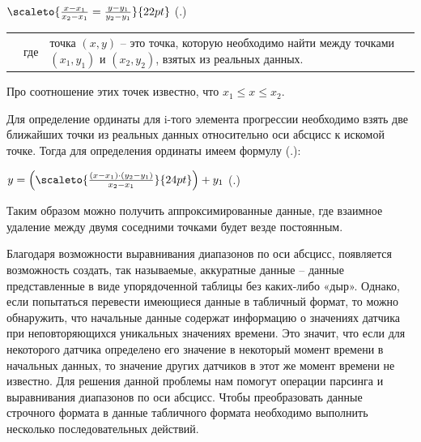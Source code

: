 {  \formulaspace \par \redline
    $\scaleto{\frac{x - x_1}{x_2 - x_1} = \frac{y - y_1}{y_2 - y_1}}{22pt}$
    \hfill (\thechaptercntr .\theformulacntr) \redline
  \formulaspace \addtocounter{formulacntr}{1}

  \begin{tabular}{p{}p{}p{}}
		& где  & точка $\left(x, y\right)$ {--} это точка, которую необходимо найти между точками $\left(x_1, y_1\right)$ и $\left(x_2, y_2\right)$, взятых из реальных данных. \\
  \end{tabular}

  \par \redline Про соотношение этих точек известно, что $x_1 \leq x \leq x_2$. 

  \par \redline Для определение ординаты для i-того элемента прогрессии необходимо взять две ближайших точки из реальных данных относительно оси абсцисс к искомой точке. Тогда для определения ординаты имеем формулу (\thechaptercntr .\theformulacntr):

  \formulaspace \par \redline
    $y = \left(\scaleto{\frac{\left(x - x_1\right) \cdot \left(y_2 - y_1\right)}{x_2 - x_1}}{24pt}\right) + y_1$
    \hfill (\thechaptercntr .\theformulacntr) \redline
  \formulaspace \addtocounter{formulacntr}{1}

  \par \redline Таким образом можно получить аппроксимированные данные, где взаимное удаление между двумя соседними точками будет везде постоянным.  

  \par \redline Благодаря возможности выравнивания диапазонов по оси абсцисс, появляется возможность создать, так называемые, аккуратные данные {--} данные представленные в виде упорядоченной таблицы без каких-либо «дыр». Однако, если попытаться перевести имеющиеся данные в табличный формат, то можно обнаружить, что начальные данные содержат информацию о значениях датчика при неповторяющихся уникальных значениях времени. Это значит, что если для некоторого датчика определено его значение в некоторый момент времени в начальных данных, то значение других датчиков в этот же момент времени не известно. Для решения данной проблемы нам помогут операции парсинга и выравнивания диапазонов по оси абсцисс. Чтобы преобразовать данные строчного формата в данные табличного формата необходимо выполнить несколько последовательных действий. 

}
